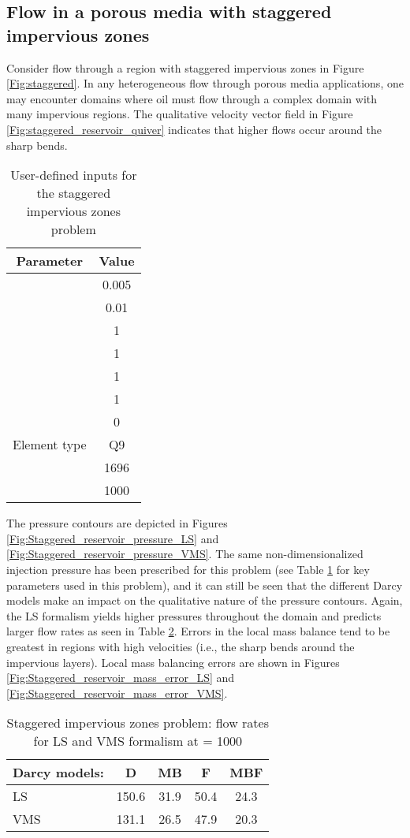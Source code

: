 \documentclass[11pt,reqno]{amsart}
\begin{document}
\subsection{Flow in a porous media with staggered impervious zones}
Consider flow through a region with staggered impervious zones in Figure 
\ref{Fig:staggered}. In any heterogeneous 
flow through porous media applications, one may encounter domains where oil must flow 
through a complex domain with many impervious regions. The qualitative velocity vector field in Figure 
\ref{Fig:staggered_reservoir_quiver} indicates that higher flows occur around the sharp 
bends.
\begin{table}[b!]
  \centering
  \caption{User-defined inputs for the staggered impervious zones problem}
  \begin{tabular}{cc}
    \hline
    Parameter & Value \\ \hline
     & 0.005\\
     & 0.01\\	
     & 1\\
     & 1\\
     & 1 \\
     & 1 \\
     & 0 \\
    Element type & Q9\\
     & 1696\\
     & 1000\\
    \hline
  \end{tabular}
  \label{Tab:staggered_zones}
\end{table}
The pressure contours are depicted in Figures \ref{Fig:Staggered_reservoir_pressure_LS} and
\ref{Fig:Staggered_reservoir_pressure_VMS}. The same non-dimensionalized injection pressure has been prescribed for 
this problem (see Table \ref{Tab:staggered_zones} for key parameters used in this 
problem), and it can still be seen that the different Darcy models make an impact on the 
qualitative nature of the pressure contours. Again, the LS formalism yields higher pressures throughout the domain 
and predicts larger flow rates as seen in Table \ref{Tab:staggered_reservoir_flowrates}. Errors in the local 
mass balance tend to be greatest in regions with high velocities (i.e., the sharp bends around the impervious layers). 
Local mass balancing errors are shown in Figures \ref{Fig:Staggered_reservoir_mass_error_LS} and 
\ref{Fig:Staggered_reservoir_mass_error_VMS}.
\begin{table}[t!]
  \centering
  \caption{Staggered impervious zones problem: flow rates for LS and VMS formalism at  = 1000}
  \begin{tabular}{l|cccc}
    \hline
    Darcy models: & D & MB & F & MBF \\ \hline
    LS & 150.6 & 31.9 & 50.4 & 24.3 \\
    VMS & 131.1 & 26.5 & 47.9 & 20.3 \\
    \hline
  \end{tabular}
  \label{Tab:staggered_reservoir_flowrates}
\end{table}  
\end{document}
